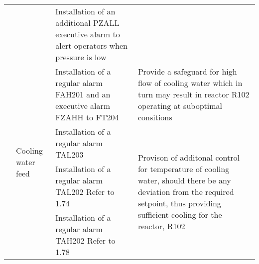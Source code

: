 \begin{table}[]
{\begin{tabular}{@{}llll@{}}
\multicolumn{1}{l|}{}                    & \multicolumn{1}{l|}{}                                           & \multicolumn{1}{l|}{Installation of an additional PZALL executive   alarm to alert operators when pressure is low}                                                                                                            & \multicolumn{1}{l|}{}                                                                                                                                                                                                       \\ \cmidrule(l){2-4} 
\multicolumn{1}{l|}{}                    & \multicolumn{1}{l|}{\multirow{4}{*}{Cooling   water feed}}      & \multicolumn{1}{l|}{Installation   of a regular alarm FAH201 and an executive alarm FZAHH to FT204}                                                                                                                           & \multicolumn{1}{l|}{Provide   a safeguard for high flow of cooling water which in turn may result in   reactor R102 operating at suboptimal consitions}                                                                     \\ \cmidrule(l){3-4} 
\multicolumn{1}{l|}{}                    & \multicolumn{1}{l|}{}                                           & \multicolumn{1}{l|}{Installation of a regular alarm TAL203}                                                                                                                                                                   & \multicolumn{1}{l|}{\multirow{3}{*}{Provison of additonal control for temperature of   cooling water, should there be any deviation from the required setpoint, thus   providing sufficient cooling for the reactor, R102}} \\ \cmidrule(lr){3-3}
\multicolumn{1}{l|}{}                    & \multicolumn{1}{l|}{}                                           & \multicolumn{1}{l|}{Installation of a regular alarm TAL202 Refer to   1.74}                                                                                                                                                   & \multicolumn{1}{l|}{}                                                                                                                                                                                                       \\
\multicolumn{1}{l|}{}                    & \multicolumn{1}{l|}{}                                           & \multicolumn{1}{l|}{Installation of a regular alarm TAH202 Refer to   1.78}                                                                                                                                                   & \multicolumn{1}{l|}{}                                                                                                                                                                                                       \\ \cmidrule(l){2-4} 

\end{tabular}}
\end{table}
